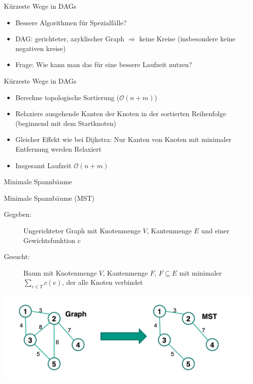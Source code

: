 \begin{frame}{Kürzeste Wege in DAGs}
	\begin{itemize}
		\item Bessere Algorithmen für Spezialfälle?
		\item DAG: gerichteter, azyklischer Graph $\Rightarrow$ keine Kreise (insbesondere keine negativen kreise)
		\item Frage: Wie kann man das für eine bessere Laufzeit nutzen?
	\end{itemize}
\end{frame}

\begin{frame}{Kürzeste Wege in DAGs}
	\begin{itemize}
		\item Berechne topologische Sortierung ($\mathcal{O}(n + m)$)
		\item Relaxiere ausgehende Kanten der Knoten in der sortierten Reihenfolge (beginnend mit dem Startknoten)
		\item Gleicher Effekt wie bei Dijkstra: Nur Kanten von Knoten mit minimaler Entfernung werden Relaxiert
		\item Insgesamt Laufzeit $\mathcal{O}(n + m)$
	\end{itemize}
\end{frame}

\begin{frame}
	\begin{center}
		\Huge
		Minimale Spannbäume
	\end{center}
\end{frame}

\begin{frame}{Minimale Spannbäume (MST)}
	\begin{description}
		\item[Gegeben:] Ungerichteter Graph mit Knotenmenge $V$, Kantenmenge $E$ und einer Gewichtsfunktion c
		\item[Gesucht:] Baum mit Knotenmenge $V$, Kantenmenge $F$, $F \subseteq E$ mit minimaler $\sum_{{
   e \in T }} c(e)$, der alle Knoten verbindet 
	\end{description}

	\includegraphics[scale = 0.25]{images/graphs}
\end{frame}

